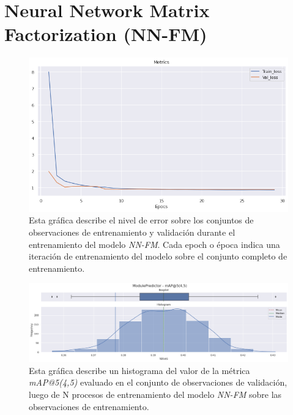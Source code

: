 \documentclass[11pt,a4paper,twoside]{thesis}
\begin{document}
\section{Neural Network Matrix Factorization (NN-FM)}

\begin{figure}[h!]
	\centering
	\includegraphics[width=13cm]{./images/metrics-NN-FM-train-val-loss.png}
	\caption{Esta gráfica describe el nivel de error sobre los conjuntos de observaciones de entrenamiento y validación durante el entrenamiento del modelo \textit{NN-FM}. Cada epoch o época indica una iteración de entrenamiento del modelo sobre el conjunto completo de entrenamiento.}
\end{figure}


\clearpage

\begin{figure}[h!]
	\centering
	\includegraphics[width=15cm]{./images/metrics-NN-FM-mapk.png}
	\caption{Esta gráfica describe un histograma del valor de la métrica \textit{mAP@5(4,5)} evaluado en el conjunto de observaciones de validación, luego de N procesos de entrenamiento del modelo \textit{NN-FM} sobre las observaciones de entrenamiento.}
\end{figure}
\end{document}

